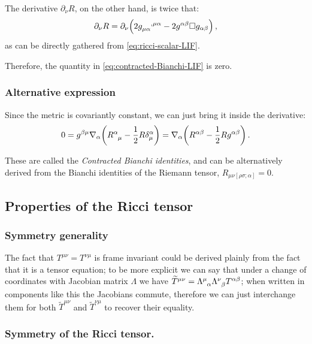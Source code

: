 \documentclass[main.tex]{subfiles}
\begin{document}
The derivative \(\partial_{\nu }R\), on the other hand, is twice that:
%
\begin{equation}
  \partial_{\nu }R = \partial_{\nu }\qty(2 \tensor{g}{_{\mu \alpha }^{, \mu \alpha }} - 2 g^{\alpha \beta }\square g_{\alpha \beta })
\,,
\end{equation}
%
as can be directly gathered from \eqref{eq:ricci-scalar-LIF}.

Therefore, the quantity in \eqref{eq:contracted-Bianchi-LIF} is zero.

\subsubsection{Alternative expression}

Since the metric is covariantly constant, we can just bring it inside the derivative:
%
\begin{equation}
  0 = g^{\beta \mu }\nabla_{\alpha }\qty(\tensor{R}{^{\alpha }_{\mu }} - \frac{1}{2} R \delta^{\alpha }_{\mu })
  = \nabla_{\alpha }\qty(R^{\alpha \beta } - \frac{1}{2} R g^{\alpha \beta })
\,.
\end{equation}
%

These are called the \emph{Contracted Bianchi identities}, and can be alternatively derived from the Bianchi identities of the Riemann tensor, \(R_{\mu \nu [\rho \sigma ; \alpha ]} = 0\).

\subsection{Properties of the Ricci tensor}

\subsubsection{Symmetry generality}

The fact that \(T^{\mu \nu } = T^{\nu \mu }\) is frame invariant could be derived plainly from the fact that it is a tensor equation; to be more explicit we can say that under a change of coordinates with Jacobian matrix \(\Lambda \) we have \(\widetilde{T}^{\mu \nu } = \tensor{\Lambda }{^{\mu }_{\alpha }} \tensor{\Lambda }{^{\nu }_{\beta }} T^{\alpha \beta }\); when written in components like this the Jacobians commute, therefore we can just interchange them for both \(\widetilde{T}^{\mu \nu }\) and \(\widetilde{T}^{\nu \mu }\) to recover their equality. 

\subsubsection{Symmetry of the Ricci tensor.}
\end{document}

